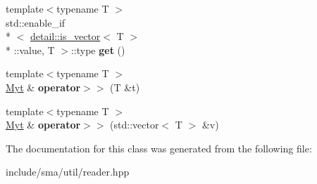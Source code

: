 \begin{DoxyCompactItemize}
\item 
\hypertarget{classsma_1_1Reader_af8585764ca870da174b23e6657e44113}{{\footnotesize template$<$typename T $>$ }\\std\-::enable\-\_\-if\\*
$<$ \hyperlink{structsma_1_1detail_1_1is__vector}{detail\-::is\-\_\-vector}$<$ T $>$\\*
\-::value, T $>$\-::type {\bfseries get} ()}\label{classsma_1_1Reader_af8585764ca870da174b23e6657e44113}

\item 
\hypertarget{classsma_1_1Reader_a83d8adcf56a5c6b73ed90eef64e39178}{{\footnotesize template$<$typename T $>$ }\\\hyperlink{classsma_1_1Reader}{Myt} \& {\bfseries operator$>$$>$} (T \&t)}\label{classsma_1_1Reader_a83d8adcf56a5c6b73ed90eef64e39178}

\item 
\hypertarget{classsma_1_1Reader_af7ce18ea24f8e1814c41c79eeaefdfc6}{{\footnotesize template$<$typename T $>$ }\\\hyperlink{classsma_1_1Reader}{Myt} \& {\bfseries operator$>$$>$} (std\-::vector$<$ T $>$ \&v)}\label{classsma_1_1Reader_af7ce18ea24f8e1814c41c79eeaefdfc6}

\end{DoxyCompactItemize}


The documentation for this class was generated from the following file\-:\begin{DoxyCompactItemize}
\item 
include/sma/util/reader.\-hpp\end{DoxyCompactItemize}
